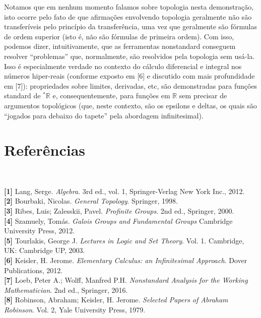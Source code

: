 \documentclass[12pt,a4paper]{article}
\theoremstyle{definition}
\begin{document}
Notamos que em nenhum momento falamos sobre topologia nesta demonstração, isto ocorre pelo fato de que afirmações envolvendo topologia geralmente não são transferíveis pelo princípio da transferência, uma vez que geralmente são fórmulas de ordem superior (isto é, não são fórmulas de primeira ordem). Com isso, podemos dizer, intuitivamente, que as ferramentas nonstandard conseguem resolver ``problemas'' que, normalmente, são resolvidos pela topologia sem usá-la. Isso é especialmente verdade no contexto do cálculo diferencial e integral nos números hiper-reais (conforme exposto em [6] e discutido com mais profundidade em [7]): propriedades sobre limites, derivadas, etc, são demonstradas para funções standard de $^*\mathbb{R}$ e, consequentemente, para funções em $\mathbb{R}$ sem precisar de argumentos topológicos (que, neste contexto, são os epsilons e deltas, os quais são ``jogados para debaixo do tapete'' pela abordagem infinitesimal).

\section{Referências}

\ 

\textbf{[1]} Lang, Serge. \textit{Algebra}. 3rd ed., vol. 1, Springer-Verlag New York Inc., 2012. \\ 

\textbf{[2]} Bourbaki, Nicolas. \textit{General Topology}. Springer, 1998. \\

\textbf{[3]} Ribes, Luis; Zalesskii, Pavel. \textit{Profinite Groups}. 2nd ed., Springer, 2000.\\

\textbf{[4]} Szamuely, Tomás. \textit{Galois Groups and Fundamental Groups} Cambridge University Press, 2012. \\

\textbf{[5]} Tourlakis, George J. \textit{Lectures in Logic and Set Theory}. Vol. 1. Cambridge, UK: Cambridge UP, 2003.  \\

\textbf{[6]} Keisler, H. Jerome. \textit{Elementary Calculus: an Infinitesimal Approach}. Dover Publications, 2012. \\

\textbf{[7]} Loeb, Peter A.; Wolff, Manfred P.H. \textit{Nonstandard Analysis for the Working Mathematician}. 2nd ed., Springer, 2016. \\

\textbf{[8]} Robinson, Abraham; Keisler, H. Jerome. \textit{Selected Papers of Abraham Robinson}. Vol. 2, Yale University Press, 1979.\\
\end{document}
